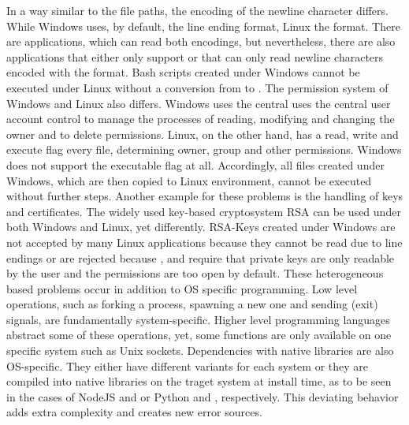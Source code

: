         In a way similar to the file paths, the encoding of the newline character differs. While Windows uses, by default, the  line ending format, Linux the  format. There are applications, which can read both encodings, but nevertheless, there are also applications that either only support  or that can only read newline characters encoded with the  format. Bash scripts created under Windows cannot be executed under Linux without a conversion from  to . The permission system of Windows and Linux also differs. Windows uses the central uses the central user account control to manage the processes of reading, modifying and changing the owner and to delete permissions. Linux, on the other hand, has a read, write and execute flag every file, determining owner, group and other permissions. Windows does not support the executable flag at all. Accordingly, all files created under Windows, which are then copied to Linux environment, cannot be executed without further steps. Another example for these problems is the handling of keys and certificates. The widely used key-based cryptosystem \ac{RSA} can be used under both Windows and Linux, yet differently. \ac{RSA}-Keys created under Windows are not accepted by many Linux applications because they cannot be read due to  line endings or are rejected because ,  and  require that private keys are only readable by the user and the permissions are too open by default.\newline
        These heterogeneous based problems occur in addition to \acl{OS} specific programming. Low level operations, such as forking a process, spawning a new one and sending (exit) signals, are fundamentally system-specific. Higher level programming languages abstract some of these operations, yet, some functions are only available on one specific system such as Unix sockets. Dependencies with native libraries are also \acl{OS}-specific. They either have different variants for each system or they are compiled into native libraries on the traget system at install time, as to be seen in the cases of NodeJS and  or Python and , respectively. This deviating behavior adds extra complexity and creates new error sources.

